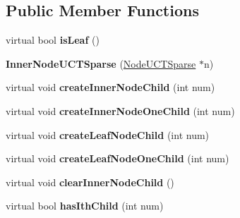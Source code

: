 \subsection*{Public Member Functions}
\begin{DoxyCompactItemize}
\item 
\hypertarget{classMultiBoost_1_1InnerNodeUCTSparse_afb08a2656465679f145c46d7a5494902}{virtual bool {\bfseries is\-Leaf} ()}\label{classMultiBoost_1_1InnerNodeUCTSparse_afb08a2656465679f145c46d7a5494902}

\item 
\hypertarget{classMultiBoost_1_1InnerNodeUCTSparse_a263a5cf7f9687d97723a411153cc429c}{{\bfseries Inner\-Node\-U\-C\-T\-Sparse} (\hyperlink{classMultiBoost_1_1NodeUCTSparse}{Node\-U\-C\-T\-Sparse} $\ast$n)}\label{classMultiBoost_1_1InnerNodeUCTSparse_a263a5cf7f9687d97723a411153cc429c}

\item 
\hypertarget{classMultiBoost_1_1InnerNodeUCTSparse_aaaa23503a7b7d6b81c7df6088d607d41}{virtual void {\bfseries create\-Inner\-Node\-Child} (int num)}\label{classMultiBoost_1_1InnerNodeUCTSparse_aaaa23503a7b7d6b81c7df6088d607d41}

\item 
\hypertarget{classMultiBoost_1_1InnerNodeUCTSparse_a92c9d857b5d37181c7a7e9d1c80bb78a}{virtual void {\bfseries create\-Inner\-Node\-One\-Child} (int num)}\label{classMultiBoost_1_1InnerNodeUCTSparse_a92c9d857b5d37181c7a7e9d1c80bb78a}

\item 
\hypertarget{classMultiBoost_1_1InnerNodeUCTSparse_aef13450e3fedb6b3de4b8f5b3cc9ac27}{virtual void {\bfseries create\-Leaf\-Node\-Child} (int num)}\label{classMultiBoost_1_1InnerNodeUCTSparse_aef13450e3fedb6b3de4b8f5b3cc9ac27}

\item 
\hypertarget{classMultiBoost_1_1InnerNodeUCTSparse_ac0a5a2cccabb2b16fd334bc1fd7ef8dd}{virtual void {\bfseries create\-Leaf\-Node\-One\-Child} (int num)}\label{classMultiBoost_1_1InnerNodeUCTSparse_ac0a5a2cccabb2b16fd334bc1fd7ef8dd}

\item 
\hypertarget{classMultiBoost_1_1InnerNodeUCTSparse_a0f1e670bc0c37c1ed6965e5a61e8211f}{virtual void {\bfseries clear\-Inner\-Node\-Child} ()}\label{classMultiBoost_1_1InnerNodeUCTSparse_a0f1e670bc0c37c1ed6965e5a61e8211f}

\item 
\hypertarget{classMultiBoost_1_1InnerNodeUCTSparse_a211da9f3f79fab897258017bbc4ab594}{virtual bool {\bfseries has\-Ith\-Child} (int num)}\label{classMultiBoost_1_1InnerNodeUCTSparse_a211da9f3f79fab897258017bbc4ab594}


\end{DoxyCompactItemize}
